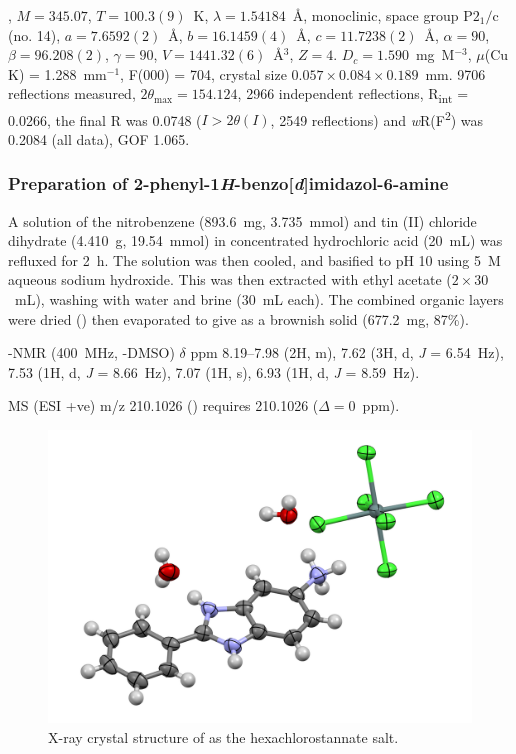 \begin{refsection}
, $M=345.07$, $T=100.3(9)$~K, $\lambda=1.54184$~\AA, monoclinic, space group $\text{P}2_1/\text{c}$ (no. 14), $a = 7.6592(2)$~\AA, $b = 16.1459(4)$~\AA, $c = 11.7238(2)$~\AA, $\alpha = 90$\degree, $\beta = 96.208(2)$\degree, $\gamma = 90$\degree, $V = 1441.32(6)$~\AA$^{3}$, $Z = 4$. $D_{c}= 1.590$~mg~M$^{-3}$, $\mu$(Cu K\a) = 1.288~mm$^{-1}$, F(000) = 704, crystal size $0.057 \times 0.084 \times 0.189$~mm. 9706 reflections measured, $2\theta_{\max}=154.124$\degree, 2966 independent reflections, R\textsubscript{int} = 0.0266, the final R was 0.0748 ($I > 2\theta(I)$, 2549 reflections) and \emph{w}R(F\textsuperscript{2}) was 0.2084 (all data), GOF 1.065. 

\subsubsection[Preparation of \refcmpd{rhs-amine}]{Preparation of 2-phenyl-1\emph{H}-benzo[\emph{d}]imidazol-6-amine }
A solution of the nitrobenzene  (893.6~mg, 3.735~mmol) and tin (II) chloride dihydrate (4.410~g, 19.54~mmol) in concentrated hydrochloric acid (20~mL) was refluxed for 2~h.
The solution was then cooled, and basified to pH 10 using 5~M aqueous sodium hydroxide.
This was then extracted with ethyl acetate ($2\times30$~mL), washing with water and brine (30~mL each).
The combined organic layers were dried () then evaporated to give  as a brownish solid (677.2~mg, 87\%).\autocite{Patrick2017}

-NMR (400~MHz, -DMSO) $\delta$ ppm 8.19--7.98 (2H, m), 7.62 (3H, d, \textit{J} = 6.54~Hz), 7.53 (1H, d, \textit{J} = 8.66~Hz), 7.07 (1H, s), 6.93 (1H, d, \textit{J} = 8.59~Hz).

MS (ESI +ve) m/z 210.1026 ()  requires 210.1026 ($\Delta=0$~ppm).

\begin{figure}[ht]
    \centering
    \includegraphics[width=0.8\linewidth]{Figures/rhs-amine-xray.pdf}
    \caption{X-ray crystal structure of  as the hexachlorostannate salt.}\label{fig:rhs-amine-xray}
\end{figure}


\end{refsection}
